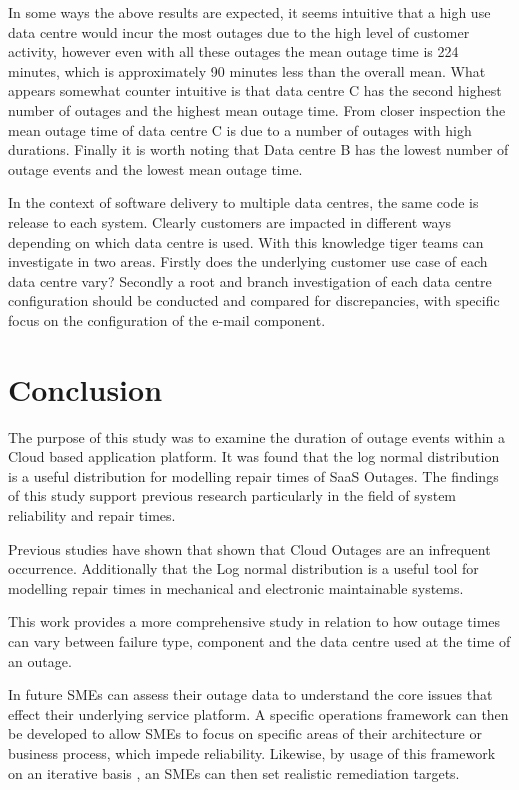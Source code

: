 \documentclass[conference]{IEEEtran}
\begin{document}
In some ways the above results are expected, it seems intuitive that a high use data centre would incur the most outages due to the high level of customer activity, however even with all these outages the mean outage time is 224 minutes, which is approximately 90 minutes less than the overall mean. What appears somewhat counter intuitive is that data centre C has the second highest number of outages and the highest mean outage time. From closer inspection the mean outage time of data centre C is due to a number of outages with high durations. Finally it is worth noting that Data centre B has the lowest number of outage events and the lowest mean outage time.\par

In the context of software delivery to multiple data centres, the same code is release to each system. Clearly customers are impacted in different ways depending on which data centre is used. With this knowledge tiger teams can investigate in two areas. Firstly does the underlying customer use case of each data centre vary? Secondly a root and branch investigation of each data centre configuration should be conducted and compared for discrepancies, with specific focus on the configuration of the e-mail component. \par
\vspace{-2mm}

\section{Conclusion}
The purpose of this study was to examine the duration of outage events within a Cloud based application platform. It was found that the log normal distribution is a useful distribution for modelling repair times of SaaS Outages. The findings of this study support previous research particularly in the field of system reliability and repair times. \par

Previous studies have shown that shown that Cloud Outages are an infrequent occurrence. Additionally that the Log normal distribution is a useful tool for modelling repair times in mechanical and electronic maintainable systems. \par

This work provides a more comprehensive study in relation to how outage times can vary between failure type, component and the data centre used at the time of an outage. \par

In future SMEs can assess their outage data to understand the core issues that effect their underlying service platform. A specific operations framework can then be developed to allow SMEs to focus on specific areas of their architecture or business process, which impede reliability. Likewise,  by usage of this framework on an iterative basis , an SMEs can then set realistic remediation targets. \par
\end{document}
